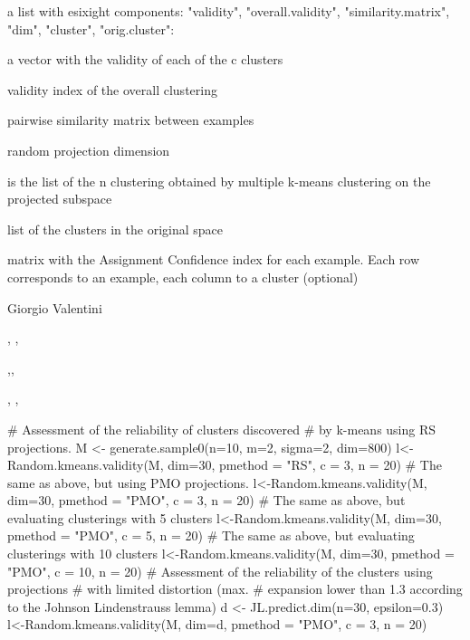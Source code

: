 \documentclass{article}
\begin{document}
\begin{Value}
a list with esixight components: "validity", "overall.validity", "similarity.matrix", "dim", 
"cluster",  "orig.cluster":
\begin{ldescription}
\item[\code{validity }] a vector with the validity of each of the c clusters
\item[\code{overall.validity }] validity index of the overall clustering
\item[\code{similarity.matrix }] pairwise similarity matrix between examples
\item[\code{dimension }] random projection dimension
\item[\code{cluster }] is the list of the n clustering obtained by multiple k-means clustering on the projected subspace
\item[\code{orig.cluster }] list of the clusters in the original space
\item[\code{AC }] matrix with the Assignment Confidence index for each example. Each row corresponds to an example, 
each column to a cluster (optional)
\end{ldescription}
\end{Value}
\begin{Author}\relax
Giorgio Valentini 
\end{Author}
\begin{SeeAlso}\relax
{}, ,  

,,

, , 
\end{SeeAlso}
\begin{Examples}
\begin{ExampleCode}
# Assessment of the reliability of clusters discovered 
# by k-means using RS projections. 
M <- generate.sample0(n=10, m=2, sigma=2, dim=800)
l<-Random.kmeans.validity(M, dim=30, pmethod = "RS", c = 3,  n = 20)
# The same as above, but using PMO projections. 
l<-Random.kmeans.validity(M, dim=30, pmethod = "PMO", c = 3, n = 20)
# The same as above, but evaluating clusterings with 5 clusters 
l<-Random.kmeans.validity(M, dim=30, pmethod = "PMO", c = 5, n = 20)
# The same as above, but evaluating clusterings with 10 clusters 
l<-Random.kmeans.validity(M, dim=30, pmethod = "PMO", c = 10, n = 20)
# Assessment of the reliability of the clusters using projections 
# with limited distortion (max. 
# expansion lower than 1.3 according to the Johnson Lindenstrauss lemma)
d <- JL.predict.dim(n=30, epsilon=0.3)
l<-Random.kmeans.validity(M, dim=d, pmethod = "PMO", c = 3, n = 20)

\end{ExampleCode}
\end{Examples}
\end{document}
